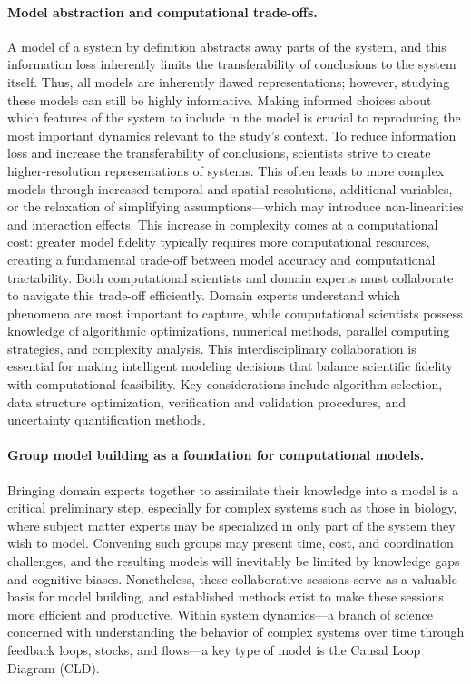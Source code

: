 \paragraph{Model abstraction and computational trade-offs.}
A model of a system by definition abstracts away parts of the system, and this information loss inherently limits the transferability of conclusions to the system itself. Thus, all models are inherently flawed representations; however, studying these models can still be highly informative. Making informed choices about which features of the system to include in the model is crucial to reproducing the most important dynamics relevant to the study's context.
To reduce information loss and increase the transferability of conclusions, scientists strive to create higher-resolution representations of systems. This often leads to more complex models through increased temporal and spatial resolutions, additional variables, or the relaxation of simplifying assumptions—which may introduce non-linearities and interaction effects. This increase in complexity comes at a computational cost: greater model fidelity typically requires more computational resources, creating a fundamental trade-off between model accuracy and computational tractability.
Both computational scientists and domain experts must collaborate to navigate this trade-off efficiently. Domain experts understand which phenomena are most important to capture, while computational scientists possess knowledge of algorithmic optimizations, numerical methods, parallel computing strategies, and complexity analysis. This interdisciplinary collaboration is essential for making intelligent modeling decisions that balance scientific fidelity with computational feasibility. Key considerations include algorithm selection, data structure optimization, verification and validation procedures, and uncertainty quantification methods.

\paragraph{Group model building as a foundation for computational models.}
Bringing domain experts together to assimilate their knowledge into a model is a critical preliminary step, especially for complex systems such as those in biology, where subject matter experts may be specialized in only part of the system they wish to model. Convening such groups may present time, cost, and coordination challenges, and the resulting models will inevitably be limited by knowledge gaps and cognitive biases. Nonetheless, these collaborative sessions serve as a valuable basis for model building, and established methods exist to make these sessions more efficient and productive.
Within system dynamics—a branch of science concerned with understanding the behavior of complex systems over time through feedback loops, stocks, and flows—a key type of model is the Causal Loop Diagram (CLD).

